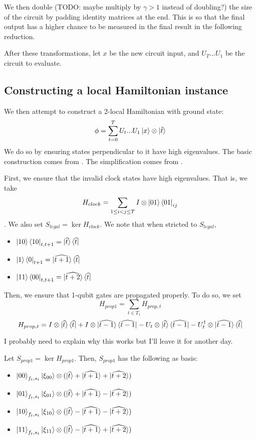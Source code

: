 \documentclass{article}
\theoremstyle{definition}
\begin{document}
We then double (TODO: maybe multiply by $\gamma>1$ instead of doubling?) the size of the circuit by padding identity matrices at the end. This is so that the final output has a higher chance to be measured in the final result in the following reduction.

After these transformations, let $x$ be the new circuit input, and $U_T...U_1$ be the circuit to evaluate.

\subsection{Constructing a local Hamiltonian instance}

We then attempt to construct a 2-local Hamiltonian with ground state: $$\phi=\sum_{t=0}^TU_t...U_1\ket{x}\otimes\ket{\hat{t}}$$
We do so by ensuring states perpendicular to it have high eigenvalues. The basic construction comes from \cite{kitaev2002classical}. The simplification comes from \cite{biamonte_love_2008}.

First, we ensure that the invalid clock states have high eigenvalues. That is, we take $$H_{clock}=\sum_{1\leq i<j\leq T} I\otimes \ket{01}\bra{01}_{ij}$$. We also set $S_{legal}=\ker H_{clock}$.
We note that when stricted to $S_{legal}$, 
\begin{itemize}
	\item $\ket{10}\bra{10}_{t,t+1}
		=\ket{\widehat{t}}\bra{\widehat{t}}$ 
	\item $\ket{1}\bra{0}_{t+1}
		=\ket{\widehat{t+1}}\bra{\widehat{t}}$
	\item $\ket{11}\bra{00}_{t,t+1}
		=\ket{\widehat{t+2}}\bra{\widehat{t}}$
\end{itemize}

Then, we ensure that 1-qubit gates are propagated properly. To do so, we set
	$$H_{prop1}=\sum_{t\in T_1}H_{prop,t}$$
	$$H_{prop,t}=I\otimes\ket{\widehat{t}}\bra{\widehat{t}}
		+I\otimes\ket{\widehat{t-1}}\bra{\widehat{t-1}}
		-U_t\otimes\ket{\widehat{t}}\bra{\widehat{t-1}}
		-U_t^\dagger\otimes\ket{\widehat{t-1}}\bra{\widehat{t}}$$

I probably need to explain why this works but I'll leave it for another day.

Let $S_{prop1}=\ker H_{prop1}$.
Then, $S_{prop1}$ has the following as basis:
\begin{itemize}
	\item $\ket{00}_{f_t,s_t}\ket{\xi_{00}}\otimes
		(\ket{\widehat{t}}+\ket{\widehat{t+1}}+\ket{\widehat{t+2}})$
	\item $\ket{01}_{f_t,s_t}\ket{\xi_{01}}\otimes
		(\ket{\widehat{t}}+\ket{\widehat{t+1}}-\ket{\widehat{t+2}})$
	\item $\ket{10}_{f_t,s_t}\ket{\xi_{10}}\otimes
		(\ket{\widehat{t}}-\ket{\widehat{t+1}}-\ket{\widehat{t+2}})$
	\item $\ket{11}_{f_t,s_t}\ket{\xi_{11}}\otimes
		(\ket{\widehat{t}}-\ket{\widehat{t+1}}+\ket{\widehat{t+2}})$
\end{itemize}
\end{document}
